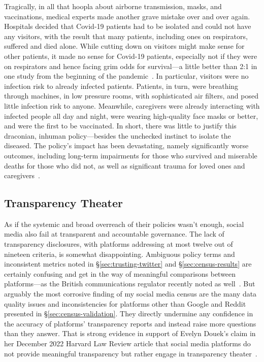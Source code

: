 Tragically, in all that hoopla about airborne transmission, masks, and
vaccinations, medical experts made another grave mistake over and over again.
Hospitals decided that Covid-19 patients had to be isolated and could not have
any visitors, with the result that many patients, including ones on respirators,
suffered and died alone. While cutting down on visitors might make sense for
other patients, it made no sense for Covid-19 patients, especially not if they
were on respirators and hence facing grim odds for survival---a little better
than 2:1 in one study from the beginning of the
pandemic~\cite{AuldCaridiScheibleea2020}. In particular, visitors were no
infection risk to already infected patients. Patients, in turn, were breathing
through machines, in low pressure rooms, with sophisticated air filters, and
posed little infection risk to anyone. Meanwhile, caregivers were already
interacting with infected people all day and night, were wearing high-quality
face masks or better, and were the first to be vaccinated. In short, there was
little to justify this draconian, inhuman policy---besides the unchecked
instinct to isolate the diseased. The policy's impact has been devastating,
namely significantly worse outcomes, including long-term impairments for those
who survived and miserable deaths for those who did not, as well as significant
trauma for loved ones and
caregivers~\cite{AndersonShawZar2020,AnnYiAzharea2021,Capozzo2020,DCouto2022,StrangBergstromea2020,WakamMontgomeryea2020}.


\subsection{Transparency Theater}
\label{sec:transparency-theater}

As if the systemic and broad overreach of their policies wasn't enough, social
media also fail at transparent and accountable governance. The lack of
transparency disclosures, with platforms addressing at most twelve out of nineteen
criteria, is somewhat disappointing. Ambiguous policy terms and inconsistent
metrics noted in \S\ref{sec:trusting-twitter} and \S\ref{sec:census-results} are
certainly confusing and get in the way of meaningful comparisons between
platforms---as the British communications regulator recently noted as
well~\cite{HarlingHenesyea2023}. But arguably the most corrosive finding of my
social media census are the many data quality issues and inconsistencies for
platforms other than Google and Reddit presented in
\S\ref{sec:census-validation}. They directly undermine any confidence in the
accuracy of platforms' transparency reports and instead raise more questions
than they answer. That is strong evidence in support of Evelyn Douek's claim in
her December 2022 Harvard Law Review article that social media platforms do not
provide meaningful transparency but rather engage in transparency
theater~\cite{Douek2022}.

